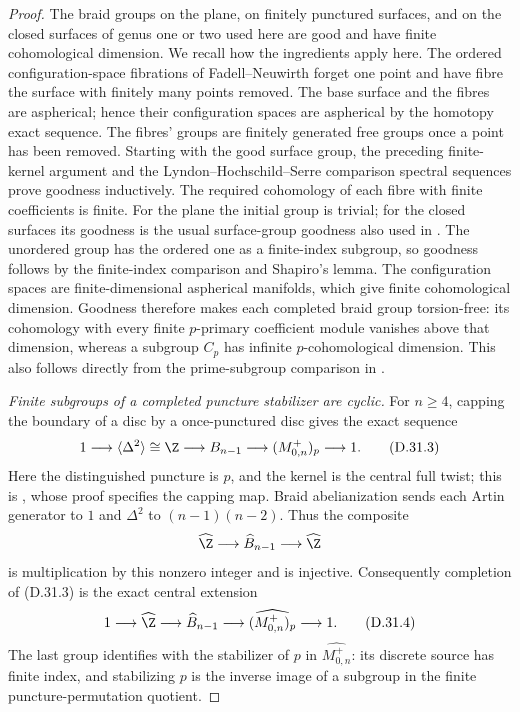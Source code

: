 \begin{proof}
The braid groups on the plane, on finitely punctured surfaces,
and on the closed surfaces of genus one or two used here are
good and have finite cohomological dimension.
We recall how the ingredients apply here. The ordered
configuration-space fibrations of Fadell--Neuwirth
\cite[Theorems~1 and~3]{A-FadellNeuwirth1962} forget one point and
have fibre the surface with finitely many points removed.
The base surface and the fibres are aspherical; hence their
configuration spaces are aspherical by the homotopy exact sequence.
The fibres' groups are finitely generated free groups once a point
has been removed. Starting with the good surface group, the
preceding finite-kernel argument and the Lyndon--Hochschild--Serre
comparison spectral sequences prove goodness inductively.
The required cohomology of each fibre with finite coefficients is
finite. For the plane the initial group is trivial; for the closed
surfaces its goodness is the usual surface-group goodness also
used in \cite{R-BZ}. The unordered group has the ordered one as a
finite-index subgroup, so goodness follows by the finite-index
comparison and Shapiro's lemma. The configuration spaces are
finite-dimensional aspherical manifolds, which give finite
cohomological dimension. Goodness therefore makes each completed
braid group torsion-free: its cohomology with every finite
$p$-primary coefficient module vanishes above that dimension,
whereas a subgroup $C_p$ has infinite $p$-cohomological dimension.
This also follows directly from the prime-subgroup comparison in
\cite[Theorem~A]{R-BZ}.

\emph{Finite subgroups of a completed puncture stabilizer are cyclic.}
For $n\geq4$, capping the boundary of a disc by a once-punctured
disc gives the exact sequence
\[
 1\longrightarrow\langle\Delta^2\rangle\cong\Z
 \longrightarrow B_{n-1}\longrightarrow
 (M_{0,n}^+)_{p}\longrightarrow1.                      \tag{D.31.3}
\]
Here the distinguished puncture is $p$, and the kernel is the
central full twist; this is
\cite[Lemma~2.2]{A-BigelowBudney2001}, whose proof specifies the
capping map. Braid abelianization sends each Artin generator to
$1$ and $\Delta^2$ to $(n-1)(n-2)$. Thus the composite
\[
 \widehat\Z\longrightarrow\widehat B_{n-1}
       \longrightarrow\widehat\Z
\]
is multiplication by this nonzero integer and is injective.
Consequently completion of (D.31.3) is the exact central extension
\[
 1\longrightarrow\widehat\Z\longrightarrow
 \widehat B_{n-1}\longrightarrow
 \widehat{(M_{0,n}^+)_{p}}\longrightarrow1.             \tag{D.31.4}
\]
The last group identifies with the stabilizer of $p$ in
$\widehat{M_{0,n}^+}$: its discrete source has finite index, and
stabilizing $p$ is the inverse image of a subgroup in the finite
puncture-permutation quotient.


\end{proof}
